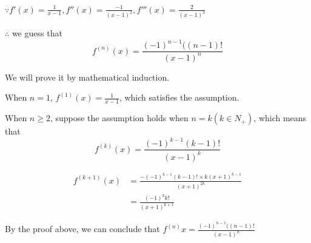 \documentclass{article}
\begin{document}
    $\because f'(x) = \frac{1}{x - 1}, f''(x) = \frac{-1}{(x - 1)^2}, f'''(x) = \frac{2}{(x - 1)^3}$

    $\therefore$ we guess that $$f^{(n)} (x) = \frac{(-1)^{n - 1}((n - 1)!}{(x - 1)^n}$$

    We will prove it by mathematical induction.

    When $n = 1$, $f^{(1)}(x) = \frac{1}{x - 1}$, which satisfies the assumption.

    When $n \geq 2$, suppose the assumption holds when $n = k(k \in N_+)$, which means that $$f^{(k)} (x) = \frac{(-1)^{k - 1}(k - 1)!}{(x - 1)^k}$$

    $$
    \begin{aligned}
        f^{(k + 1)}(x) &= \frac{-(-1)^{k - 1}  (k - 1)!\times k(x + 1)^{k - 1}}{(x + 1)^{2k}} \\
        &= \frac{(-1)^k k!}{(x + 1)^{k + 1}}
    \end{aligned}
    $$

    By the proof above, we can conclude that $f^{(n)} x = \frac{(-1)^{n - 1}((n - 1)!}{(x - 1)^n}$
\end{document}
